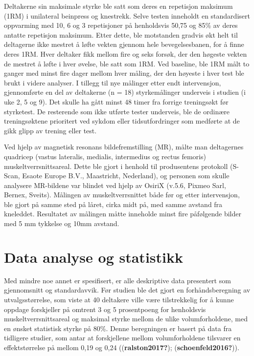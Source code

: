 \documentclass[
  letterpaper,
  DIV=11,
  numbers=noendperiod]{scrreprt}
\begin{document}
Deltakerne sin maksimale styrke ble satt som deres en repetisjon
maksimum (1RM) i unilateral beinpress og knestrekk. Selve testen
inneholdt en standardisert oppvarming med 10, 6 og 3 repetisjoner på
henholdsvis 50,75 og 85\% av deres antatte repetisjon maksimum. Etter
dette, ble motstanden gradvis økt helt til deltagerne ikke mestret å
løfte vekten gjennom hele bevegelsesbanen, for å finne deres 1RM. Hver
deltaker fikk mellom fire og seks forsøk, der den høgeste vekten de
mestret å løfte i hver øvelse, ble satt som 1RM. Ved baseline, ble 1RM
målt to ganger med minst fire dager mellom hver måling, der den høyeste
i hver test ble brukt i videre analyser. I tillegg til nye målinger
etter endt intervensjon, gjennomførte en del av deltakerne (n = 18)
styrkemålinger underveis i studien (i uke 2, 5 og 9). Det skulle ha gått
minst 48 timer fra forrige treningsøkt før styrketest. De resterende som
ikke utførte tester underveis, ble de ordinære treningsøktene prioritert
ved sykdom eller tidsutfordringer som medførte at de gikk glipp av
trening eller test.

Ved hjelp av magnetisk resonans bildefremstilling (MR), målte man
deltagernes quadricep (vastus lateralis, medialis, intermedius og rectus
femoris) muskeltverrsnittsareal. Dette ble gjort i henhold til
produsentens protokoll (S-Scan, Esaote Europe B.V., Maastricht,
Nederland), og personen som skulle analysere MR-bildene var blindet ved
hjelp av OsiriX (v.5.6, Pixmeo Sarl, Bernex, Sveits). Målingen av
muskeltverrsnittet både før og etter intervensjon, ble gjort på samme
sted på låret, cirka midt på, med samme avstand fra kneleddet.
Resultatet av målingen måtte inneholde minst fire påfølgende bilder med
5 mm tykkelse og 10mm avstand.

\section{Data analyse og statistikk}\label{data-analyse-og-statistikk}

Med mindre noe annet er spesifisert, er alle deskriptive data presentert
som gjennomsnitt og standardavvik. Før studien ble det gjort en
forhåndsberegning av utvalgsstørrelse, som viste at 40 deltakere ville
være tilstrekkelig for å kunne oppdage forskjeller på omtrent 3 og 5
prosentpoeng for henholdsvis muskeltverrsnittsareal og maksimal styrke
mellom de ulike volumforholdene, med en ønsket statistisk styrke på
80\%. Denne beregningen er basert på data fra tidligere studier, som
antar at forskjellene mellom volumforholdene tilsvarer en
effektstørrelse på mellom 0,19 og 0,24 ((\textbf{ralston2017?});
(\textbf{schoenfeld2016?})).
\end{document}

